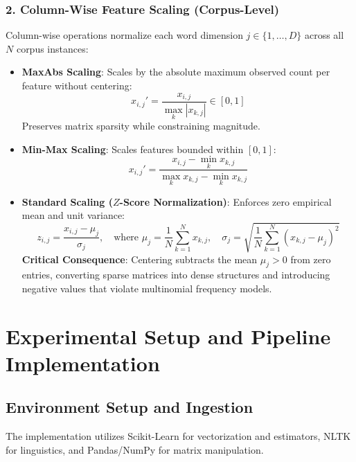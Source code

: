 \documentclass[12pt]{article}
\begin{document}
\subsubsection{2. Column-Wise Feature Scaling (Corpus-Level)}
Column-wise operations normalize each word dimension $j \in \{1, \dots, D\}$ across all $N$ corpus instances:
\begin{itemize}
    \item \textbf{MaxAbs Scaling}: Scales by the absolute maximum observed count per feature without centering:
    \begin{equation}
        x_{i,j}' = \frac{x_{i,j}}{\max_{k} |x_{k,j}|} \in [0, 1]
    \end{equation}
    Preserves matrix sparsity while constraining magnitude.
    \item \textbf{Min-Max Scaling}: Scales features bounded within $[0, 1]$:
    \begin{equation}
        x_{i,j}' = \frac{x_{i,j} - \min_{k} x_{k,j}}{\max_{k} x_{k,j} - \min_{k} x_{k,j}}
    \end{equation}
    \item \textbf{Standard Scaling ($Z$-Score Normalization)}: Enforces zero empirical mean and unit variance:
    \begin{equation}
        z_{i,j} = \frac{x_{i,j} - \mu_j}{\sigma_j}, \quad \text{where } \mu_j = \frac{1}{N}\sum_{k=1}^N x_{k,j}, \quad \sigma_j = \sqrt{\frac{1}{N}\sum_{k=1}^N (x_{k,j} - \mu_j)^2}
    \end{equation}
    \textbf{Critical Consequence}: Centering subtracts the mean $\mu_j > 0$ from zero entries, converting sparse matrices into dense structures and introducing negative values that violate multinomial frequency models.
\end{itemize}

\newpage
\section{Experimental Setup and Pipeline Implementation}

\subsection{Environment Setup and Ingestion}
The implementation utilizes Scikit-Learn for vectorization and estimators, NLTK for linguistics, and Pandas/NumPy for matrix manipulation.
\end{document}
